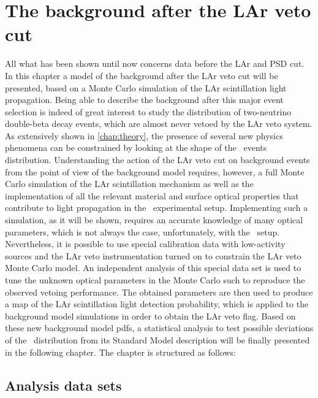 
\chapter{The background after the LAr veto cut}%
\label{chap:bkg:lar:ph2}

All what has been shown until now concerns data before the LAr and PSD cut. In this
chapter a model of the background after the LAr veto cut will be presented, based on a
Monte Carlo simulation of the LAr scintillation light propagation. Being able to describe
the background after this major event selection is indeed of great interest to study the
distribution of two-neutrino double-beta decay events, which are almost never vetoed by
the LAr veto system. As extensively shown in \cref{chap:theory}, the presence of several
new physics phenomena can be constrained by looking at the shape of the \nnbb\ events
distribution. Understanding the action of the LAr veto cut on background events from the
point of view of the background model requires, however, a full Monte Carlo simulation of
the LAr scintillation mechanism as well as the implementation of all the relevant material
and surface optical properties that contribute to light propagation in the \gerda\ experimental
setup. Implementing such a simulation, as it will be shown, requires an accurate knowledge
of many optical parameters, which is not always the case, unfortunately, with the \gerda\
setup. Nevertheless, it is possible to use special calibration data with low-activity
sources and the LAr veto instrumentation turned on to constrain the LAr veto Monte Carlo
model. An independent analysis of this special data set is used to tune the unknown
optical parameters in the Monte Carlo such to reproduce the observed vetoing performance.
The obtained parameters are then used to produce a map of the LAr scintillation light
detection probability, which is applied to the background model simulations in order to
obtain the LAr veto flag. Based on these new background model pdfs, a statistical analysis
to test possible deviations of the \nnbb\ distribution from its Standard Model description
will be finally presented in the following chapter.
\newpar
The chapter is structured as follows: 

\section{Analysis data sets}%
\label{sec:bkg:lar:ph2:data}

